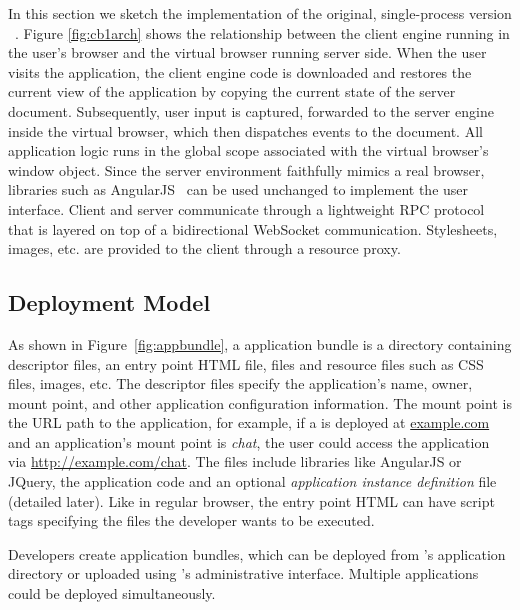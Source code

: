 In this section we sketch the implementation of
the original, single-process version \cb{}~\cite{mcdaniel2012cloudbrowser}.
Figure \ref{fig:cb1arch} shows the relationship
between the client engine running in the user's browser and the virtual browser
running server side.  When the user visits the application, the client engine
code is downloaded and restores the current view of the application by
copying the current state of the server document.  Subsequently, user input
is captured, forwarded to the server engine inside the virtual browser,
which then dispatches events to the document.  All application logic runs
in the global scope associated with the virtual browser's window object.
Since the server environment faithfully mimics a real browser, libraries
such as AngularJS~\cite{hevery2009angular} can be used unchanged to implement the user interface.
Client and server communicate through a lightweight RPC protocol that is
layered on top of a bidirectional WebSocket communication.
Stylesheets, images, etc. are provided to the client through a resource
proxy.

\subsection{Deployment Model}
\label{sec:deploymodel}

\appbundlefig{}

As shown in Figure~\ref{fig:appbundle}, 
a \cb application bundle is a directory
containing descriptor files, an entry point HTML file,
\js files and resource files such as CSS files, images, etc.
The descriptor files specify the application's name, owner, mount point, and
other application configuration information.
The mount point is the URL path to the application, for example,
if a \cb is deployed at \url{example.com} and an application's mount point is
\emph{chat}, the user could access the application via \url{http://example.com/chat}.
The \js files include libraries like AngularJS or JQuery, 
the application code and an optional \emph{application instance definition}
file (detailed later).
Like in regular browser, the entry point HTML can have script tags
specifying the \js files the developer wants to be executed.

Developers create application bundles, which can be deployed
from \cb's application directory or uploaded using \cb's administrative
interface.  Multiple applications could be deployed simultaneously.

\chatappfig{}

